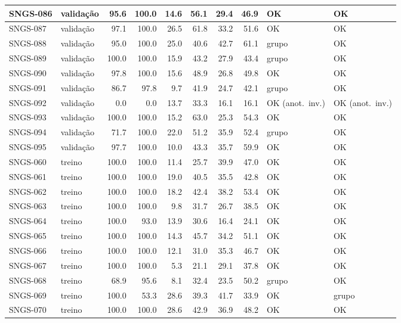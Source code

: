 \begin{small}
\begin{longtable}{|l|l|r|r|r|r|r|r|l|l|}
SNGS-086 & validação & 95.6 & 100.0 & 14.6 & 56.1 & 29.4 & 46.9 & OK & OK \\ \hline
SNGS-087 & validação & 97.1 & 100.0 & 26.5 & 61.8 & 33.2 & 51.6 & OK & OK \\ \hline
SNGS-088 & validação & 95.0 & 100.0 & 25.0 & 40.6 & 42.7 & 61.1 & grupo & OK \\ \hline
SNGS-089 & validação & 100.0 & 100.0 & 15.9 & 43.2 & 27.9 & 43.4 & grupo & OK \\ \hline
SNGS-090 & validação & 97.8 & 100.0 & 15.6 & 48.9 & 26.8 & 49.8 & OK & OK \\ \hline
SNGS-091 & validação & 86.7 & 97.8 & 9.7 & 41.9 & 24.7 & 42.1 & grupo & OK \\ \hline
SNGS-092 & validação & 0.0 & 0.0 & 13.7 & 33.3 & 16.1 & 16.1 & OK (anot.\ inv.) & OK (anot.\ inv.) \\ \hline
SNGS-093 & validação & 100.0 & 100.0 & 15.2 & 63.0 & 25.3 & 54.3 & OK & OK \\ \hline
SNGS-094 & validação & 71.7 & 100.0 & 22.0 & 51.2 & 35.9 & 52.4 & grupo & OK \\ \hline
SNGS-095 & validação & 97.7 & 100.0 & 10.0 & 43.3 & 35.7 & 59.9 & OK & OK \\ \hline
SNGS-060 & treino & 100.0 & 100.0 & 11.4 & 25.7 & 39.9 & 47.0 & OK & OK \\ \hline
SNGS-061 & treino & 100.0 & 100.0 & 19.0 & 40.5 & 35.5 & 42.8 & OK & OK \\ \hline
SNGS-062 & treino & 100.0 & 100.0 & 18.2 & 42.4 & 38.2 & 53.4 & OK & OK \\ \hline
SNGS-063 & treino & 100.0 & 100.0 & 9.8 & 31.7 & 26.7 & 38.5 & OK & OK \\ \hline
SNGS-064 & treino & 100.0 & 93.0 & 13.9 & 30.6 & 16.4 & 24.1 & OK & OK \\ \hline
SNGS-065 & treino & 100.0 & 100.0 & 14.3 & 45.7 & 34.2 & 51.1 & OK & OK \\ \hline
SNGS-066 & treino & 100.0 & 100.0 & 12.1 & 31.0 & 35.3 & 46.7 & OK & OK \\ \hline
SNGS-067 & treino & 100.0 & 100.0 & 5.3 & 21.1 & 29.1 & 37.8 & OK & OK \\ \hline
SNGS-068 & treino & 68.9 & 95.6 & 8.1 & 32.4 & 23.5 & 50.2 & grupo & OK \\ \hline
SNGS-069 & treino & 100.0 & 53.3 & 28.6 & 39.3 & 41.7 & 33.9 & OK & grupo \\ \hline
SNGS-070 & treino & 100.0 & 100.0 & 28.6 & 42.9 & 36.9 & 48.2 & OK & OK \\ \hline

\end{longtable}
\end{small}
